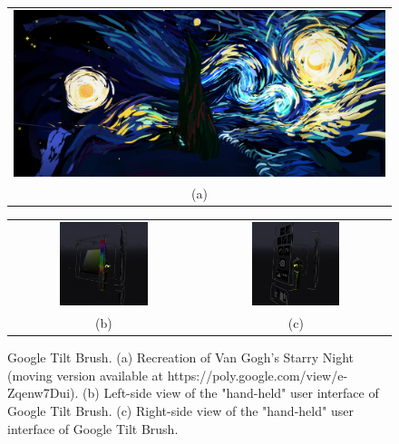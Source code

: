 \begin{figure}
    \centering
    \setlength{\tabcolsep}{0.0130\linewidth}
    \begin{tabular}{@{}c@{}}
    \includegraphics[width=\linewidth]{figures/TiltBrush_StarryNight}\\
    (a)
    \end{tabular}
    
    \centering
    \setlength{\tabcolsep}{0.0130\linewidth}
    \begin{tabular}{@{}cc@{}}
   	\includegraphics[width=0.487\textwidth]{figures/Tilt_menu2}&
    \includegraphics[width=0.487\textwidth]{figures/Tilt_menu1}\\
    (b)&(c)\\
    \end{tabular}
    \caption[Google Tilt Brush]{Google Tilt Brush.
    	  \textup{(a)} Recreation of Van Gogh's Starry Night (moving version available at https://poly.google.com/view/e-Zqenw7Dui).
			  \textup{(b)} Left-side view of the "hand-held" user interface of Google Tilt Brush. \textup{(c)} Right-side view of the "hand-held" user interface of Google Tilt Brush.
      \label{fig:tiltart}}
\end{figure}

